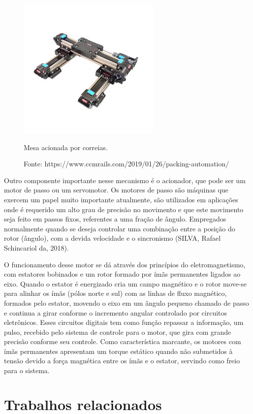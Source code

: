 \begin{figure}[!htb]
\centering
\includegraphics[scale = 1]{figuras/2-3}
\caption{Mesa acionada por correias.}
\caption*{Fonte: https://www.ccmrails.com/2019/01/26/packing-automation/}
\label{fig:mcorreia}
\end{figure}
    
Outro componente importante nesse mecanismo é o acionador, que pode ser um motor de passo ou um servomotor. 
Os motores  de passo são máquinas que exercem um papel muito importante atualmente, são utilizados em 
aplicações onde é requerido um alto grau de precisão no movimento e que este movimento seja feito em passos 
fixos, referentes a uma fração de ângulo. Empregados normalmente quando se deseja controlar uma combinação 
entre a posição do rotor (ângulo), com a devida velocidade e o sincronismo (SILVA, Rafael Schincariol da, 2018).

O funcionamento desse motor se dá através dos princípios do eletromagnetismo, com estatores bobinados e um rotor 
formado por ímãs permanentes ligados ao eixo. Quando o estator é energizado cria um campo magnético e o rotor 
move-se para alinhar os ímãs (pólos norte e sul) com as linhas de  fluxo magnético, formados pelo estator, 
movendo o eixo em um ângulo pequeno chamado de passo e continua a girar conforme o incremento angular controlado 
por circuitos eletrônicos. Esses circuitos digitais tem como função repassar a informação, um pulso, recebido 
pelo sistema de controle para o motor, que gira com grande precisão conforme seu controle. Como característica 
marcante, os motores com ímãs permanentes apresentam um torque estático quando não submetidos à tensão devido 
a força magnética entre os ímãs e o estator, servindo como freio para o sistema.
 
\section{Trabalhos relacionados}\label{sec:trabalhos}

